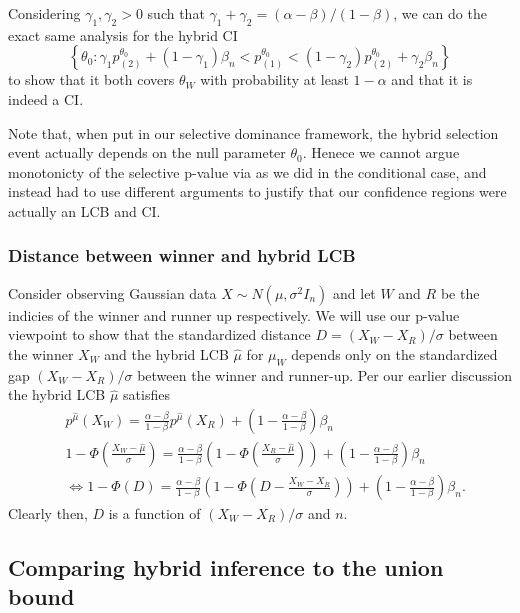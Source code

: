 \documentclass{article}
\begin{document}
\begin{appendix}
Considering $\gamma_1, \gamma_2 > 0$ such that $\gamma_1 + \gamma_2 = (\alpha-\beta)/(1-\beta)$, we can do the exact same analysis for the hybrid CI
\begin{equation*}
    \left\{\theta_0 : \gamma_1 p^{\theta_0}_{(2)} + (1-\gamma_1)\beta_n < p^{\theta_0}_{(1)} < (1- \gamma_2)p_{(2)}^{\theta_0} + \gamma_2 \beta_n\right\}
\end{equation*}
to show that it both covers $\theta_W$ with probability at least $1-\alpha$ and that it is indeed a CI. 

Note that, when put in our selective dominance framework, the hybrid selection event actually depends on the null parameter $\theta_0$. Henece we cannot argue monotonicty of the selective p-value via  as we did in the conditional case, and instead had to use different arguments to justify that our confidence regions were actually an LCB and CI. 

\subsubsection{Distance between winner and hybrid LCB}
\label{sec:hybrid_gap_appdx}

Consider observing Gaussian data $X \sim N(\mu, \sigma^2 I_n)$ and let $W$ and $R$ be the indicies of the winner and runner up respectively. We will use our p-value viewpoint to show that the standardized distance $D = (X_W - X_R)/\sigma$ between the winner $X_W$ and the hybrid LCB $\hat{\mu}$ for $\mu_W$ depends only on the standardized gap $(X_W - X_R)/\sigma$ between the winner and runner-up. Per our earlier discussion the hybrid LCB $\hat{\mu}$ satisfies 
\begin{align*}
    & p^{\hat{\mu}}(X_W) = \frac{\alpha-\beta}{1-\beta} p^{\hat{\mu}}(X_R) + \left(1 - \frac{\alpha-\beta}{1-\beta} \right)\beta_n\\
    & 1 - \Phi\left(\frac{X_W - \hat{\mu}}{\sigma}\right) = \frac{\alpha-\beta}{1-\beta} \left(1 - \Phi\left(\frac{X_R - \hat{\mu}}{\sigma}\right)\right) + \left(1 - \frac{\alpha-\beta}{1-\beta} \right)\beta_n\\ 
    &\iff 1 - \Phi(D) = \frac{\alpha-\beta}{1-\beta} \left(1 - \Phi\left(D - \frac{X_W - X_R}{\sigma}\right) \right) + \left(1 - \frac{\alpha-\beta}{1-\beta} \right)\beta_n.
\end{align*}
Clearly then, $D$ is a function of $(X_W - X_R)/\sigma$ and $n$.

\subsection{Comparing hybrid inference to the union bound}
\label{sec:hybrid_sim_appdx}


\end{appendix}
\end{document}

